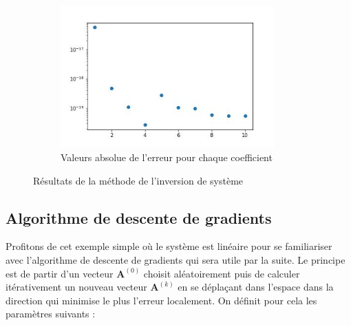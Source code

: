 \documentclass[12pt]{report}
\begin{document}
\begin{figure}
\begin{subfigure}[b]{0.4\textwidth}
        \includegraphics[width=0.9\textwidth, height=0.9\textwidth]{coefs_1_inv_erreur.jpg}
        \caption{Valeurs absolue de l'erreur pour chaque coefficient}
    \end{subfigure}
       \caption{Résultats de la méthode de l'inversion de système}
       \label{fig:résultats 1 inv}
\end{figure}



\subsection{Algorithme de descente de gradients}

Profitons de cet exemple simple où le système est linéaire pour se familiariser avec l'algorithme de descente de gradients qui sera utile par la suite.
Le principe est de  partir d'un vecteur $\bm{A}^{(0)}$ choisit aléatoirement puis de calculer itérativement un nouveau vecteur $\bm{A}^{(k)}$ en se déplaçant dans l'espace dans la direction qui minimise le plus l'erreur localement.
On définit pour cela les paramètres suivants :
\end{document}
